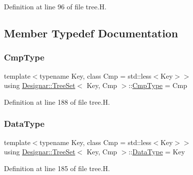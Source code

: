 Definition at line 96 of file tree.\+H.



\subsection{Member Typedef Documentation}
\mbox{\label{class_designar_1_1_tree_set_a556e79c8fffe1f172a60848942672fa7}} 
\subsubsection{\texorpdfstring{Cmp\+Type}{CmpType}}
{\footnotesize\ttfamily template$<$typename Key, class Cmp = std\+::less$<$\+Key$>$$>$ \\
using \hyperlink{class_designar_1_1_tree_set}{Designar\+::\+Tree\+Set}$<$ Key, Cmp $>$\+::\hyperlink{class_designar_1_1_tree_set_a556e79c8fffe1f172a60848942672fa7}{Cmp\+Type} =  Cmp}



Definition at line 188 of file tree.\+H.

\mbox{\label{class_designar_1_1_tree_set_a14a0b2c4c9e4db09003126217094bfe8}} 
\subsubsection{\texorpdfstring{Data\+Type}{DataType}}
{\footnotesize\ttfamily template$<$typename Key, class Cmp = std\+::less$<$\+Key$>$$>$ \\
using \hyperlink{class_designar_1_1_tree_set}{Designar\+::\+Tree\+Set}$<$ Key, Cmp $>$\+::\hyperlink{class_designar_1_1_tree_set_a14a0b2c4c9e4db09003126217094bfe8}{Data\+Type} =  Key}



Definition at line 185 of file tree.\+H.

\mbox{\label{class_designar_1_1_tree_set_a3d4237612f151579b02ff5c7735df07a}} 
